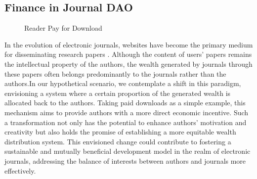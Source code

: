 \documentclass[lettersize,journal]{IEEEtran}
\begin{document}
\subsection{Finance in Journal DAO}


\begin{figure}[!ht]
  \centering
  \hfil
  \caption{Reader Pay for Download}
  \label{artcledownload}
\end{figure}


In the evolution of electronic journals, websites have become the primary medium for disseminating research papers \cite{lancaster1995evolution}. Although the content of users' papers remains the intellectual property of the authors, the wealth generated by journals through these papers often belongs predominantly to the journals rather than the authors.In our hypothetical scenario, we contemplate a shift in this paradigm, envisioning a system where a certain proportion of the generated wealth is allocated back to the authors. Taking paid downloads as a simple example, this mechanism aims to provide authors with a more direct economic incentive. Such a transformation not only has the potential to enhance authors' motivation and creativity but also holds the promise of establishing a more equitable wealth distribution system. This envisioned change could contribute to fostering a sustainable and mutually beneficial development model in the realm of electronic journals, addressing the balance of interests between authors and journals more effectively.
\end{document}
